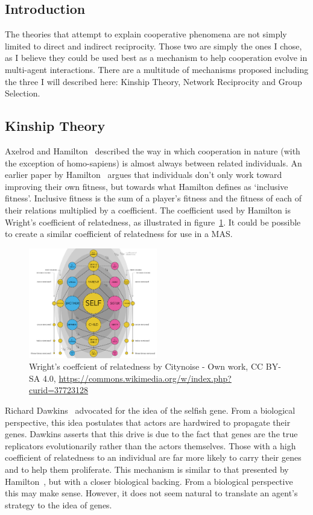 \documentclass[]{final_report}
\begin{document}
\subsection{Introduction}
The theories that attempt to explain cooperative phenomena are not simply limited to direct and indirect reciprocity. Those two are simply the ones I chose, as I believe they could be used best as a mechanism to help cooperation evolve in multi-agent interactions. There are a multitude of mechanisms proposed including the three I will described here: Kinship Theory, Network Reciprocity and Group Selection.
\subsection{Kinship Theory}
\label{appendix:kin}
Axelrod and Hamilton~\cite{evolution_of_cooperation} described the way in which cooperation in nature (with the exception of homo-sapiens) is almost always between related individuals. An earlier paper by Hamilton~\cite{kinhamilton} argues that individuals don't only work toward improving their own fitness, but towards what Hamilton defines as `inclusive fitness'. Inclusive fitness is the sum of a player's fitness and the fitness of each of their relations multiplied by a coefficient. The coefficient used by Hamilton is Wright's coefficient of relatedness, as illustrated in figure~\ref{fig:coefrelate}. It could be possible to create a similar coefficient of relatedness for use in a MAS.
\begin{figure}
	\center
	\includegraphics[width=0.5\textwidth]{coefrelate.png}
	\caption{Wright's coeffcient of relatedness by Citynoise - Own work, CC BY-SA 4.0, \url{https://commons.wikimedia.org/w/index.php?curid=37723128}}
	\label{fig:coefrelate}
\end{figure}
\par
Richard Dawkins~\cite{selfish_gene} advocated for the idea of the selfish gene. From a biological perspective, this idea postulates that actors are hardwired to propagate their genes. Dawkins asserts that this drive is due to the fact that genes are the true replicators evolutionarily rather than the actors themselves. Those with a high coefficient of relatedness to an individual are far more likely to carry their genes and to help them proliferate. This mechanism is similar to that presented by Hamilton~\cite{kinhamilton}, but with a closer biological backing. From a biological perspective this may make sense. However, it does not seem natural to translate an agent's strategy to the idea of genes.\par
\end{document}
